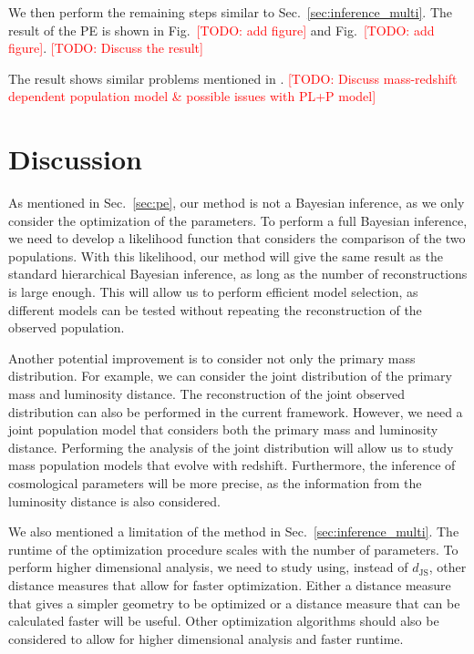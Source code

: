 \documentclass[twocolumn]{aastex631}
\newcommand{\todo}[1]{\textcolor{red}{[TODO: #1]}}
\begin{document}
We then perform the remaining steps similar to Sec.~\ref{sec:inference_multi}.
The result of the \ac{PE} is shown in Fig.~\todo{add figure} and Fig.~\todo{add figure}.
\todo{Discuss the result}

The result shows similar problems mentioned in \citet{Pierra:2024wrk}.
\todo{Discuss mass-redshift dependent population model \& possible issues with PL+P model}

\section{Discussion}
\label{sec:discussion}

As mentioned in Sec.~\ref{sec:pe}, our method is not a Bayesian inference, as we only consider the optimization of the parameters.
To perform a full Bayesian inference, we need to develop a likelihood function that considers the comparison of the two populations.
With this likelihood, our method will give the same result as the standard hierarchical Bayesian inference, as long as the number of reconstructions is large enough.
This will allow us to perform efficient model selection, as different models can be tested without repeating the reconstruction of the observed population.

Another potential improvement is to consider not only the primary mass distribution.
For example, we can consider the joint distribution of the primary mass and luminosity distance.
The reconstruction of the joint observed distribution can also be performed in the current framework.
However, we need a joint population model that considers both the primary mass and luminosity distance.
Performing the analysis of the joint distribution will allow us to study mass population models that evolve with redshift.
Furthermore, the inference of cosmological parameters will be more precise, as the information from the luminosity distance is also considered.

We also mentioned a limitation of the method in Sec.~\ref{sec:inference_multi}.
The runtime of the optimization procedure scales with the number of parameters.
To perform higher dimensional analysis, we need to study using, instead of $d_\mathrm{JS}$, other distance measures that allow for faster optimization.
Either a distance measure that gives a simpler geometry to be optimized or a distance measure that can be calculated faster will be useful.
Other optimization algorithms should also be considered to allow for higher dimensional analysis and faster runtime.
\end{document}
